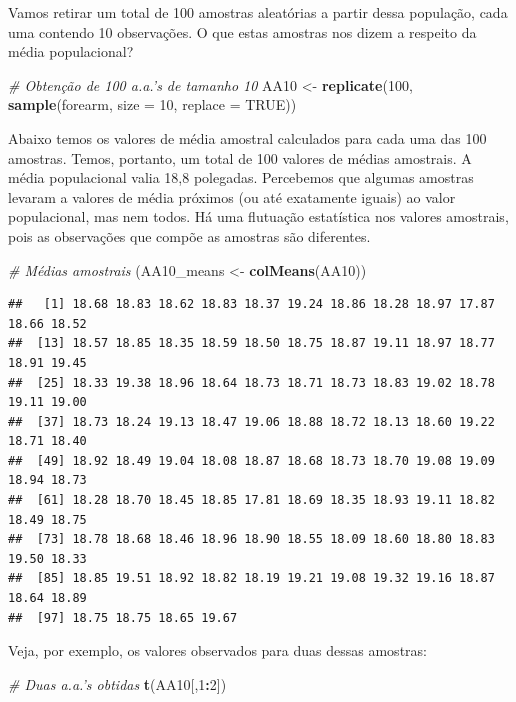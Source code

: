 \documentclass[
]{book}
\newenvironment{Shaded}{\begin{snugshade}}{\end{snugshade}}
\newcommand{\CommentTok}[1]{\textcolor[rgb]{0.56,0.35,0.01}{\textit{#1}}}
\newcommand{\DataTypeTok}[1]{\textcolor[rgb]{0.13,0.29,0.53}{#1}}
\newcommand{\DecValTok}[1]{\textcolor[rgb]{0.00,0.00,0.81}{#1}}
\newcommand{\KeywordTok}[1]{\textcolor[rgb]{0.13,0.29,0.53}{\textbf{#1}}}
\newcommand{\NormalTok}[1]{#1}
\newcommand{\OperatorTok}[1]{\textcolor[rgb]{0.81,0.36,0.00}{\textbf{#1}}}
\newcommand{\OtherTok}[1]{\textcolor[rgb]{0.56,0.35,0.01}{#1}}
\newcommand{\StringTok}[1]{\textcolor[rgb]{0.31,0.60,0.02}{#1}}
\theoremstyle{definition}
\theoremstyle{definition}
\theoremstyle{definition}
\theoremstyle{remark}
\begin{document}
Vamos retirar um total de 100 amostras aleatórias a partir dessa população, cada uma contendo 10 observações. O que estas amostras nos dizem a respeito da média populacional?

\begin{Shaded}
\begin{Highlighting}[]
\CommentTok{# Obtenção de 100 a.a.'s de tamanho 10}
\NormalTok{AA10 <-}\StringTok{ }\KeywordTok{replicate}\NormalTok{(}\DecValTok{100}\NormalTok{, }\KeywordTok{sample}\NormalTok{(forearm, }\DataTypeTok{size =} \DecValTok{10}\NormalTok{, }\DataTypeTok{replace =} \OtherTok{TRUE}\NormalTok{))}
\end{Highlighting}
\end{Shaded}

Abaixo temos os valores de média amostral calculados para cada uma das 100 amostras. Temos, portanto, um total de 100 valores de médias amostrais. A média populacional valia 18,8 polegadas. Percebemos que algumas amostras levaram a valores de média próximos (ou até exatamente iguais) ao valor populacional, mas nem todos. Há uma flutuação estatística nos valores amostrais, pois as observações que compõe as amostras são diferentes.

\begin{Shaded}
\begin{Highlighting}[]
\CommentTok{# Médias amostrais}
\NormalTok{(AA10_means <-}\StringTok{ }\KeywordTok{colMeans}\NormalTok{(AA10))}
\end{Highlighting}
\end{Shaded}

\begin{verbatim}
##   [1] 18.68 18.83 18.62 18.83 18.37 19.24 18.86 18.28 18.97 17.87 18.66 18.52
##  [13] 18.57 18.85 18.35 18.59 18.50 18.75 18.87 19.11 18.97 18.77 18.91 19.45
##  [25] 18.33 19.38 18.96 18.64 18.73 18.71 18.73 18.83 19.02 18.78 19.11 19.00
##  [37] 18.73 18.24 19.13 18.47 19.06 18.88 18.72 18.13 18.60 19.22 18.71 18.40
##  [49] 18.92 18.49 19.04 18.08 18.87 18.68 18.73 18.70 19.08 19.09 18.94 18.73
##  [61] 18.28 18.70 18.45 18.85 17.81 18.69 18.35 18.93 19.11 18.82 18.49 18.75
##  [73] 18.78 18.68 18.46 18.96 18.90 18.55 18.09 18.60 18.80 18.83 19.50 18.33
##  [85] 18.85 19.51 18.92 18.82 18.19 19.21 19.08 19.32 19.16 18.87 18.64 18.89
##  [97] 18.75 18.75 18.65 19.67
\end{verbatim}

Veja, por exemplo, os valores observados para duas dessas amostras:

\begin{Shaded}
\begin{Highlighting}[]
\CommentTok{# Duas a.a.'s obtidas}
\KeywordTok{t}\NormalTok{(AA10[,}\DecValTok{1}\OperatorTok{:}\DecValTok{2}\NormalTok{])}
\end{Highlighting}
\end{Shaded}
\end{document}
